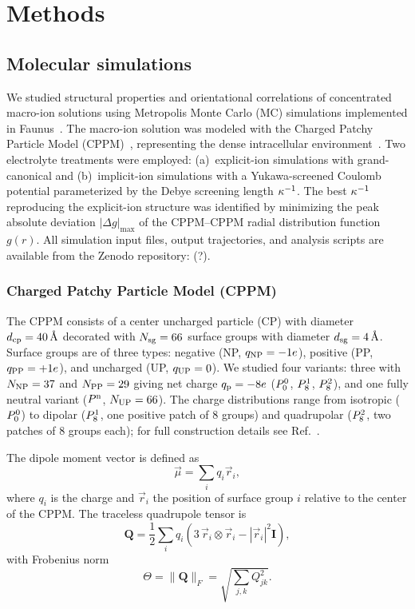 \documentclass{article}
\begin{document}
\section{Methods}
\label{sec:methods}

\subsection{Molecular simulations}

We studied structural properties and orientational correlations of concentrated macro-ion solutions using Metropolis Monte Carlo (MC) simulations implemented in Faunus~\cite{stenqvist2013}.
The macro-ion solution was modeled with the Charged Patchy Particle Model (CPPM)~\cite{yigit2015a}, representing the dense intracellular environment~\cite{wennerstrom_colloidal_2020}.
Two electrolyte treatments were employed: (a)~explicit-ion simulations with grand-canonical  and (b)~implicit-ion simulations with a Yukawa-screened Coulomb potential parameterized by the Debye screening length $\kappa^{-1}$.
The best $\kappa^{-1}$ reproducing the explicit-ion structure was identified by minimizing the peak absolute deviation $|\Delta g|_\text{max}$ of the CPPM--CPPM radial distribution function $g(r)$.
All simulation input files, output trajectories, and analysis scripts are available from the Zenodo repository: (?).

\subsubsection{Charged Patchy Particle Model (CPPM)}

The CPPM consists of a center uncharged particle (CP) with diameter $d_{\mathrm{cp}} = \qty{40}{\angstrom}$ decorated with $N_{\mathrm{sg}} = 66$ surface groups with diameter $d_{\mathrm{sg}} = \qty{4}{\angstrom}$.
Surface groups are of three types: negative (NP, $q_{\mathrm{NP}} = -1e$), positive (PP, $q_{\mathrm{PP}} = +1e$), and uncharged (UP, $q_{\mathrm{UP}} = 0$).
We studied four variants: three with $N_{\mathrm{NP}}=37$ and $N_{\mathrm{PP}}=29$ giving net charge $q_{\mathrm{p}} = -8e$ ($P^{0}_{0}$, $P^{1}_{8}$, $P^{2}_{8}$), and one fully neutral variant ($P^\mathrm{n}$, $N_{\mathrm{UP}}=66$).
The charge distributions range from isotropic ($P^{0}_{0}$) to dipolar ($P^{1}_{8}$, one positive patch of 8 groups) and quadrupolar ($P^{2}_{8}$, two patches of 8 groups each); for full construction details see Ref.~\cite{yigit2015a}.

The dipole moment vector is defined as
\begin{equation}
    \vec{\mu} = \sum_i q_i \vec{r}_i,
    \label{eq:dipole}
\end{equation}
where $q_i$ is the charge and $\vec{r}_i$ the position of surface group $i$ relative to the center of the CPPM.
The traceless quadrupole tensor is
\begin{equation}
    \mathbf{Q} = \frac{1}{2}\sum_i q_i
    \left( 3\,\vec{r}_i \otimes \vec{r}_i - |\vec{r}_i|^2 \mathbf{I} \right),
    \label{eq:quadrupole}
\end{equation}
with Frobenius norm
\begin{equation}
    \Theta = \|\mathbf{Q}\|_F = \sqrt{\sum_{j,k} Q_{jk}^2}.
    \label{eq:frobenius}
\end{equation}
\end{document}
